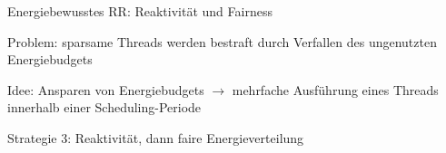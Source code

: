 \documentclass[a4paper]{article}
\begin{document}
\begin{multicols}{3}
    Energiebewusstes RR: Reaktivität und Fairness

    \begin{itemize*}
        \item
        Problem: sparsame Threads werden bestraft durch Verfallen des
        ungenutzten Energiebudgets
        \item
        Idee: Ansparen von Energiebudgets $\rightarrow$
        mehrfache Ausführung eines Threads innerhalb einer Scheduling-Periode
        \item
        Strategie 3: Reaktivität, dann faire Energieverteilung
    \end{itemize*}


\end{multicols}
\end{document}
